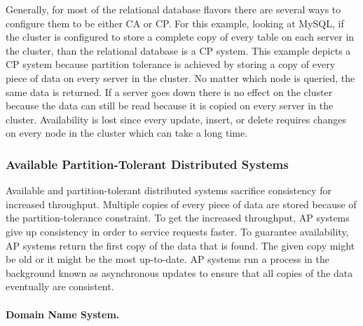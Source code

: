 \documentclass[12pt]{ucthesis}
\begin{document}
Generally, for most of the relational database flavors there are several ways to configure them to be either CA or CP. For this example, looking at MySQL, if the cluster is configured to store a complete copy of every table on each server in the cluster, than the relational database is a CP system. This example depicts a CP system because partition tolerance is achieved by storing a copy of every piece of data on every server in the cluster. No matter which node is queried, the same data is returned. If a server goes down there is no effect on the cluster
because the data can still be read because it is copied on every server in the cluster. Availability is lost
since every update, insert, or delete requires changes on every node in the cluster which can take a long time.

\subsubsection{Available Partition-Tolerant Distributed Systems}

Available and partition-tolerant distributed systems sacrifice consistency for increased throughput.
Multiple copies of every piece of data are stored because of the partition-tolerance constraint. To
get the increased throughput, AP systems give up consistency in order to service requests faster. To
guarantee availability, AP systems return the first copy of the data that is found. The given copy might be old
or it might be the most up-to-date. AP systems run a process in the background known as asynchronous updates to ensure that all copies of the data eventually are consistent. 

\paragraph{Domain Name System.}
\end{document}
